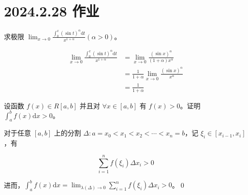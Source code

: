 \ifx\allfiles\undefined

\date{}
\author{尹锦润}

\maketitle
\fi

\section{2024.2.28 作业}

\begin{ques}
	求极限 $\displaystyle \lim _{x\rightarrow 0}\frac{\int _{0}^{x}(\sin t)^{\alpha }\mathrm{d} t}{x^{1+\alpha }}( \alpha  >0)$。
\end{ques}




\begin{equation*}
	\begin{aligned}
		\lim _{x\rightarrow 0}\frac{\int _{0}^{x}(\sin t)^{\alpha }\mathrm{d} t}{x^{1+\alpha }} & =\lim _{x\rightarrow 0}\frac{(\sin x)^{\alpha }}{( 1+\alpha ) x^{\alpha }}\\
		& =\frac{1}{1+\alpha }\lim _{x\rightarrow 0}\frac{(\sin x)^{\alpha }}{x^{\alpha }}\\
		& =\frac{1}{1+\alpha }
	\end{aligned}
\end{equation*}




\begin{ques}
	设函数 $\displaystyle f( x) \in R[ a,b]$ 并且对 $\displaystyle \forall x\in [ a,b]$ 有 $\displaystyle f( x)  >0$。证明 $\displaystyle \int _{a}^{b} f( x)\mathrm{d} x >0$。
\end{ques}



对于任意 $\displaystyle [ a,b]$ 上的分割 $\displaystyle \Delta :a=x_{0} < x_{1} < x_{2} < \cdots < x_{n} =b$，记 $\displaystyle \xi _{i} \in [ x_{i-1} ,x_{i}]$，有


\begin{equation*}
	\sum _{i=1}^{n} f( \xi _{i}) \Delta x_{i}  >0
\end{equation*}

进而，$\displaystyle \int _{a}^{b} f( x)\mathrm{d} x=\lim _{\lambda ( \Delta )\rightarrow 0}\sum _{i=1}^{n} f( \xi _{i}) \Delta x_{i}  >0$。\qed 






